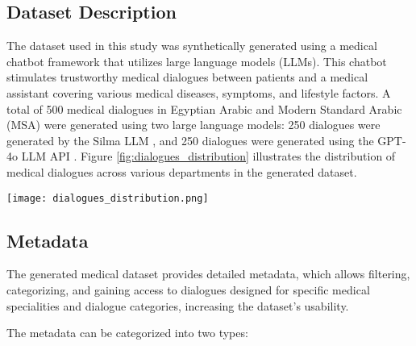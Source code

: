 \documentclass[manuscript,screen,review]{acmart}
\begin{document}
\subsection{Dataset Description}
The dataset used in this study was synthetically generated using a medical chatbot framework that utilizes large language models (LLMs). This chatbot stimulates trustworthy medical dialogues between patients and a medical assistant covering various medical diseases, symptoms, and lifestyle factors.
A total of 500 medical dialogues in Egyptian Arabic and Modern Standard Arabic (MSA) were generated using two large language models: 250 dialogues were generated by the Silma LLM \cite{silma_01_2024}, and 250 dialogues were generated using the GPT-4o LLM API \cite{OpenAI_GPT4o_2024}.
Figure \ref{fig:dialogues_distribution} illustrates the distribution of medical dialogues across various departments in the generated dataset.

\begin{figure*}[htbp]
    \centering
    \texttt{[image: dialogues\_distribution.png]} 
    \caption{Distribution of Medical Dialogues by Department}
    \label{fig:dialogues_distribution}
\end{figure*}

\subsection{Metadata}
The generated medical dataset provides detailed metadata, which allows filtering, categorizing, and gaining access to dialogues designed for specific medical specialities and dialogue categories, increasing the dataset's usability.

The metadata can be categorized into two types:
\end{document}
